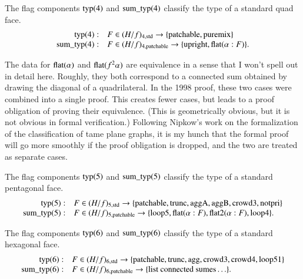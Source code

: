 \begin{definition}
The flag components ${\operatorname{typ}}(4)$ and ${\operatorname{sum\_typ}}(4)$
classify the type of a standard quad face.
    $$
    \begin{array}{rll}
    {\operatorname{typ}}(4):& F\in (H/f)_{4,{\operatorname{std}}}
    \to
    \{{\operatorname{patchable}},{\operatorname{puremix}}\}\\
    {\operatorname{sum\_typ}}(4):& F\in (H/f)_{4,{\operatorname{patchable}}}
    \to
    \{{\operatorname{upright}},{\operatorname{flat}}(\alpha:F)\}.
    \end{array}
    $$
\end{definition}

\begin{remark}
The data for ${\operatorname{flat}}(\alpha)$ and ${\operatorname{flat}}(f^2\alpha)$ are
equivalence in a sense that I won't spell out in detail here.
Roughly, they both correspond to a connected sum obtained by drawing the
diagonal of a quadrilateral. In the 1998 proof, these two cases
were combined into a single proof. This creates fewer cases, but
leads to a proof obligation of proving their equivalence.  (This
is geometrically obvious, but it is not obvious in formal
verification.) Following Nipkow's work on the formalization of the
classification of tame plane graphs, it is my hunch that the
formal proof will go more smoothly if the proof obligation is
dropped, and the two are treated as separate cases.
\end{remark}

\begin{definition}
The flag components ${\operatorname{typ}}(5)$ and ${\operatorname{sum\_typ}}(5)$
classify the type of a standard pentagonal face.
    $$
    \begin{array}{rll}
    {\operatorname{typ}}(5):& F\in (H/f)_{5,{\operatorname{std}}}
    \to
    \{{\operatorname{patchable}},{\operatorname{trunc}},{\operatorname{aggA}},{\operatorname{aggB}},{\operatorname{crowd3}},{\operatorname{notpri}}\}\\
    {\operatorname{sum\_typ}}(5):& F\in (H/f)_{5,{\operatorname{patchable}}}
    \to
    \{{\operatorname{loop5}},{\operatorname{flat}}(\alpha:F),{\operatorname{flat2}}(\alpha:F),{\operatorname{loop4}}\}.
    \end{array}
    $$
\end{definition}

\begin{definition}
The flag components ${\operatorname{typ}}(6)$ and ${\operatorname{sum\_typ}}(6)$
classify the type of a standard hexagonal face.
    $$
    \begin{array}{rll}
    {\operatorname{typ}}(6):& F\in (H/f)_{6,{\operatorname{std}}}
    \to
    \{{\operatorname{patchable}},{\operatorname{trunc}},{\operatorname{agg}},{\operatorname{crowd3}},{\operatorname{crowd4}},{\operatorname{loop51}}\}\\
    {\operatorname{sum\_typ}}(6):& F\in (H/f)_{6,{\operatorname{patchable}}}
    \to
    \{\text{list connected sumes}\ldots\}.
    \end{array}
    $$
\end{definition}

